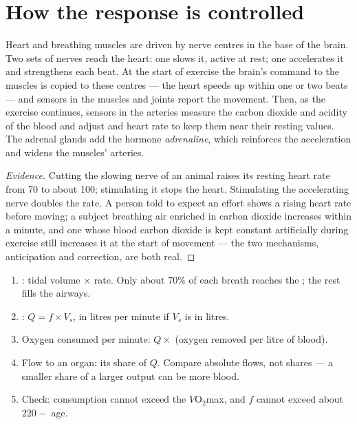 \section{How the response is controlled}

\begin{proposition}\label{prop:g10:heart-lungs-effort:control}
Heart and breathing muscles are driven by nerve centres in the base of
the brain. Two sets of nerves reach the heart: one slows it, active at
rest; one accelerates it and strengthens each beat. At the start of
exercise the brain's command to the muscles is copied to these centres
--- the heart speeds up within one or two beats --- and sensors in the
muscles and joints report the movement. Then, as the exercise
continues, sensors in the arteries measure the carbon dioxide and
acidity of the blood and adjust  and heart rate to keep
them near their resting values. The adrenal glands add the hormone
\emph{adrenaline}, which reinforces the acceleration
and widens the muscles' arteries.
\end{proposition}
\begin{proof}[Evidence]
Cutting the slowing nerve of an animal raises its resting heart rate
from 70 to about 100; stimulating it stops the heart. Stimulating the
accelerating nerve doubles the rate. A person told to expect an effort
shows a rising heart rate before moving; a subject breathing air
enriched in carbon dioxide increases  within a minute, and
one whose blood carbon dioxide is kept constant artificially during
exercise still increases it at the start of movement --- the two
mechanisms, anticipation and correction, are both real.
\end{proof}

\begin{method}\label{met:g10:heart-lungs-effort:compute}
\begin{enumerate}
  \item {}: tidal volume $\times$ rate. Only about 70\% of
        each breath reaches the ; the rest fills the airways.
  \item {}: $Q = f \times V_s$, in litres per minute if
        $V_s$ is in litres.
  \item Oxygen consumed per minute: $Q \times$ (oxygen removed per
        litre of blood).
  \item Flow to an organ: its share of $Q$. Compare absolute flows,
        not shares --- a smaller share of a larger output can be more
        blood.
  \item Check: consumption cannot exceed the $\dot V\!\mathrm{O_2}$max,
        and $f$ cannot exceed about $220 - $ age.
\end{enumerate}
\end{method}

